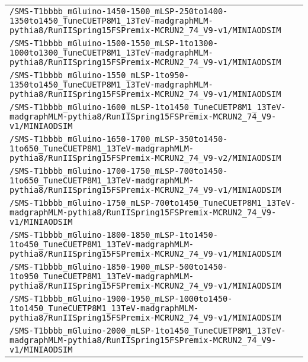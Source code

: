 \begin{center}
\begin{tabular}{l}
\verb!/SMS-T1bbbb_mGluino-1450-1500_mLSP-250to1400-1350to1450_TuneCUETP8M1_13TeV-madgraphMLM-pythia8/RunIISpring15FSPremix-MCRUN2_74_V9-v1/MINIAODSIM! \tabularnewline
\verb!/SMS-T1bbbb_mGluino-1500-1550_mLSP-1to1300-1000to1300_TuneCUETP8M1_13TeV-madgraphMLM-pythia8/RunIISpring15FSPremix-MCRUN2_74_V9-v1/MINIAODSIM! \tabularnewline
\verb!/SMS-T1bbbb_mGluino-1550_mLSP-1to950-1350to1450_TuneCUETP8M1_13TeV-madgraphMLM-pythia8/RunIISpring15FSPremix-MCRUN2_74_V9-v1/MINIAODSIM! \tabularnewline
\verb!/SMS-T1bbbb_mGluino-1600_mLSP-1to1450_TuneCUETP8M1_13TeV-madgraphMLM-pythia8/RunIISpring15FSPremix-MCRUN2_74_V9-v1/MINIAODSIM! \tabularnewline
\verb!/SMS-T1bbbb_mGluino-1650-1700_mLSP-350to1450-1to650_TuneCUETP8M1_13TeV-madgraphMLM-pythia8/RunIISpring15FSPremix-MCRUN2_74_V9-v2/MINIAODSIM! \tabularnewline
\verb!/SMS-T1bbbb_mGluino-1700-1750_mLSP-700to1450-1to650_TuneCUETP8M1_13TeV-madgraphMLM-pythia8/RunIISpring15FSPremix-MCRUN2_74_V9-v1/MINIAODSIM! \tabularnewline
\verb!/SMS-T1bbbb_mGluino-1750_mLSP-700to1450_TuneCUETP8M1_13TeV-madgraphMLM-pythia8/RunIISpring15FSPremix-MCRUN2_74_V9-v1/MINIAODSIM! \tabularnewline
\verb!/SMS-T1bbbb_mGluino-1800-1850_mLSP-1to1450-1to450_TuneCUETP8M1_13TeV-madgraphMLM-pythia8/RunIISpring15FSPremix-MCRUN2_74_V9-v1/MINIAODSIM! \tabularnewline
\verb!/SMS-T1bbbb_mGluino-1850-1900_mLSP-500to1450-1to950_TuneCUETP8M1_13TeV-madgraphMLM-pythia8/RunIISpring15FSPremix-MCRUN2_74_V9-v1/MINIAODSIM! \tabularnewline
\verb!/SMS-T1bbbb_mGluino-1900-1950_mLSP-1000to1450-1to1450_TuneCUETP8M1_13TeV-madgraphMLM-pythia8/RunIISpring15FSPremix-MCRUN2_74_V9-v1/MINIAODSIM! \tabularnewline
\verb!/SMS-T1bbbb_mGluino-2000_mLSP-1to1450_TuneCUETP8M1_13TeV-madgraphMLM-pythia8/RunIISpring15FSPremix-MCRUN2_74_V9-v1/MINIAODSIM! \tabularnewline
\hline
\end{tabular}\end{center}

